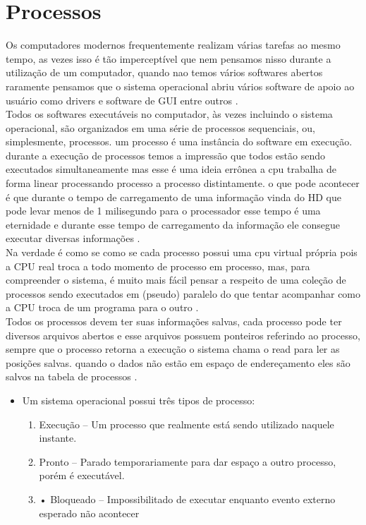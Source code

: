 
\section{Processos}\label{sec:Processos}

Os computadores modernos frequentemente realizam várias tarefas ao mesmo tempo, as vezes isso é tão imperceptível que nem pensamos nisso durante a utilização de um computador, quando nao temos vários softwares abertos raramente pensamos que o sistema operacional abriu vários software de apoio ao usuário como drivers e software de GUI entre outros \cite{Tanenbaum2016}.\\
Todos os softwares executáveis no computador, às vezes incluindo o sistema operacional, são organizados em uma série de processos sequenciais, ou, simplesmente, processos. um processo é uma instância do software em execução.  durante a execução de processos temos a impressão que todos estão sendo executados simultaneamente mas esse é uma ideia errônea a cpu trabalha de forma linear processando processo a processo distintamente. o que pode acontecer é que durante o tempo de carregamento de uma informação vinda do HD que pode levar menos de 1 milisegundo para o processador esse tempo é uma eternidade e durante esse tempo de carregamento da informação ele consegue executar diversas informações \cite{Tanenbaum2016}.\\
Na verdade é como se como se cada processo possui  uma cpu virtual própria  pois a CPU real troca a todo momento de processo em processo, mas, para compreender o sistema, é muito mais fácil pensar a respeito de uma coleção de processos sendo executados em (pseudo) paralelo do que tentar acompanhar como a CPU troca de um programa para o outro \cite{Tanenbaum2016}.\\
Todos os processos devem ter suas informações salvas, cada processo pode ter diversos arquivos abertos e esse arquivos possuem ponteiros referindo ao processo, sempre que o processo retorna a execução o sistema chama o read para ler as posições salvas. quando o dados não estão em espaço de endereçamento eles são salvos na tabela de processos \cite{Tanenbaum2016}.

\begin{itemize}[label=$-$]
	\item Um sistema operacional possui três tipos de processo:
    \begin{enumerate}
        \item Execução – Um processo que realmente está sendo utilizado naquele
        instante.
        \item Pronto – Parado temporariamente para dar espaço a outro processo,
        porém é executável.
        \item • Bloqueado – Impossibilitado de executar enquanto evento externo
        esperado não acontecer
    \end{enumerate}
\end{itemize}


